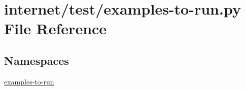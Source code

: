 \hypertarget{internet_2test_2examples-to-run_8py}{}\section{internet/test/examples-\/to-\/run.py File Reference}
\label{internet_2test_2examples-to-run_8py}
\subsection*{Namespaces}
\begin{DoxyCompactItemize}
\item 
 \hyperlink{namespaceexamples-to-run}{examples-\/to-\/run}
\end{DoxyCompactItemize}
